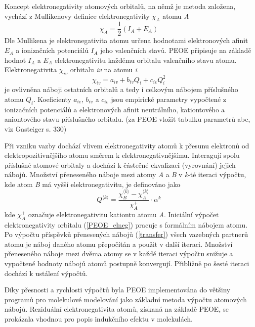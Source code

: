 Koncept elektronegativity atomových orbitalů, na němž je metoda založena, vychází z Mullikenovy definice elektronegativity $\chi_A$ atomu \textit{A}
\begin{equation}
    \chi_A = \frac{1}{2}(I_A + E_A)
\end{equation}
Dle Mullikena je elektronegativita atomu určena hodnotami elektronových afinit $ E_A$ a ionizačních potenciálů $I_A$ jeho valenčních stavů. PEOE připisuje na základě hodnot $I_A$ a $ E_A$ elektronegativitu každému orbitalu valenčního stavu atomu. Elektronegativita $\chi_{iv}$ orbitalu \textit{iv} na atomu \textit{i}
\begin{equation}
\label{PEOE_elneg}
    \chi_{iv} = a_{iv} + b_{iv}Q_i + c_{iv}Q_i^2
\end{equation}
je ovlivněna náboji ostatních orbitalů a tedy i celkovým nábojem příslušného atomu $Q_i$. Koeficienty $a_{iv}$, $b_{iv}$ a $c_{iv}$ jsou empirické parametry vypočtené z ionizačních potenciálů a elektronových afinit neutrálního, kationtového a aniontového stavu příslušného orbitalu. (za PEOE vložit tabulku parametrů abc, viz Gasteiger s. 330)

Při vzniku vazby dochází vlivem elektronegativity atomů k přesunu elektronů od elektropozitivnějšího atomu směrem k elektronegativnějšímu. Interagují spolu přísluš\-né atomové orbitaly a dochází k částečné ekvalizaci (vyrovnání) jejich nábojů. Množ\-ství přeneseného náboje mezi atomy \textit{A} a \textit{B} v \textit{k}-té iteraci výpočtu, kde atom \textit{B} má vyšší elektronegativitu, je definováno jako 
\begin{equation}
\label{transfer}
    Q^{\langle k \rangle} = \frac{\chi_B^{\langle k \rangle} - \chi_A^{\langle k \rangle}}{\chi_A^+} \cdot \alpha^k
\end{equation}
kde $\chi_A^+$ označuje elektronegativitu kationtu atomu \textit{A}. Iniciální výpočet elektronegativity orbitalu (\ref{PEOE_elneg}) pracuje s formálním nábojem atomu. Po výpočtu příspěvků přenesených nábojů (\ref{transfer}) všech vazebných partnerů atomu je náboj daného atomu přepočítán a použit v další iteraci. Množství přeneseného náboje mezi dvěma atomy se v každé iteraci výpočtu snižuje a vypočtené hodnoty nábojů atomů postupně konvergují. Přibližně po šesté iteraci dochází k ustálení výpočtů. 

Díky přesnosti a rychlosti výpočtů byla PEOE implementována do většiny programů pro molekulové modelování jako základní metoda výpočtu atomových nábojů. Reziduální elektronegativita atomů, získaná na základě PEOE, se prokázala vhodnou pro popis indukčního efektu v molekulách. 

